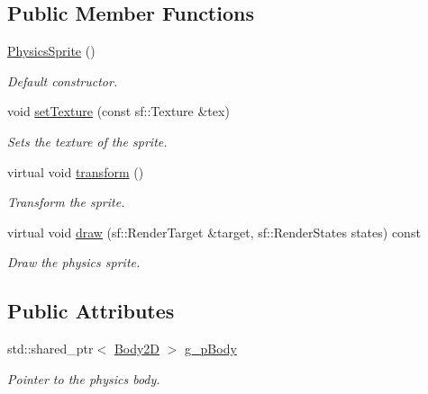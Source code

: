 \subsection*{Public Member Functions}
\begin{DoxyCompactItemize}
\item 
\hypertarget{class_physics_sprite_a811ffe62810312784c4e632b54fadcdd}{\hyperlink{class_physics_sprite_a811ffe62810312784c4e632b54fadcdd}{Physics\+Sprite} ()}\label{class_physics_sprite_a811ffe62810312784c4e632b54fadcdd}

\begin{DoxyCompactList}\small\item\em Default constructor. \end{DoxyCompactList}\item 
void \hyperlink{class_physics_sprite_a5bceac4964f6995180af4ed21fcd1ae5}{set\+Texture} (const sf\+::\+Texture \&tex)
\begin{DoxyCompactList}\small\item\em Sets the texture of the sprite. \end{DoxyCompactList}\item 
\hypertarget{class_physics_sprite_a97720abd69161c946b159d2e5e7fca36}{virtual void \hyperlink{class_physics_sprite_a97720abd69161c946b159d2e5e7fca36}{transform} ()}\label{class_physics_sprite_a97720abd69161c946b159d2e5e7fca36}

\begin{DoxyCompactList}\small\item\em Transform the sprite. \end{DoxyCompactList}\item 
virtual void \hyperlink{class_physics_sprite_a96d93c233739c0b4ec3bce383db4b84f}{draw} (sf\+::\+Render\+Target \&target, sf\+::\+Render\+States states) const 
\begin{DoxyCompactList}\small\item\em Draw the physics sprite. \end{DoxyCompactList}\end{DoxyCompactItemize}
\subsection*{Public Attributes}
\begin{DoxyCompactItemize}
\item 
\hypertarget{class_physics_sprite_a763f9c183b5ddd1ea41992e011738792}{std\+::shared\+\_\+ptr$<$ \hyperlink{class_body2_d}{Body2\+D} $>$ \hyperlink{class_physics_sprite_a763f9c183b5ddd1ea41992e011738792}{g\+\_\+p\+Body}}\label{class_physics_sprite_a763f9c183b5ddd1ea41992e011738792}

\begin{DoxyCompactList}\small\item\em Pointer to the physics body. \end{DoxyCompactList}\end{DoxyCompactItemize}
